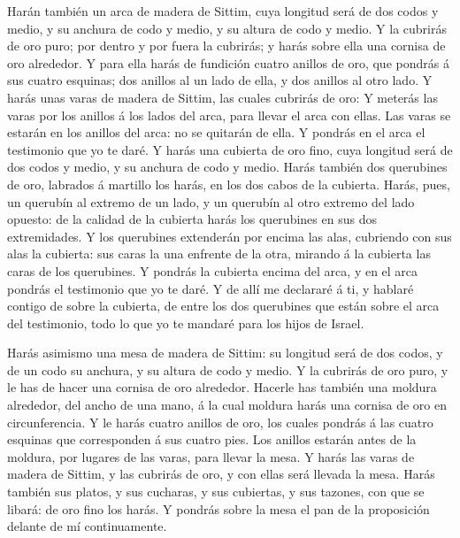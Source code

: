  Harán también un arca de madera de Sittim, cuya longitud
será de dos codos y medio, y su anchura de codo y medio, y su altura de
codo y medio.  Y la cubrirás de oro puro; por dentro y por
fuera la cubrirás; y harás sobre ella una cornisa de oro alrededor.
 Y para ella harás de fundición cuatro anillos de oro, que
pondrás á sus cuatro esquinas; dos anillos al un lado de ella, y dos
anillos al otro lado.  Y harás unas varas de madera de
Sittim, las cuales cubrirás de oro:  Y meterás las varas
por los anillos á los lados del arca, para llevar el arca con ellas.
 Las varas se estarán en los anillos del arca: no se
quitarán de ella.  Y pondrás en el arca el testimonio que
yo te daré.  Y harás una cubierta de oro fino, cuya
longitud será de dos codos y medio, y su anchura de codo y medio.
 Harás también dos querubines de oro, labrados á martillo
los harás, en los dos cabos de la cubierta.  Harás, pues,
un querubín al extremo de un lado, y un querubín al otro extremo del
lado opuesto: de la calidad de la cubierta harás los querubines en sus
dos extremidades.  Y los querubines extenderán por encima
las alas, cubriendo con sus alas la cubierta: sus caras la una enfrente
de la otra, mirando á la cubierta las caras de los querubines.
 Y pondrás la cubierta encima del arca, y en el arca
pondrás el testimonio que yo te daré.  Y de allí me
declararé á ti, y hablaré contigo de sobre la cubierta, de entre los dos
querubines que están sobre el arca del testimonio, todo lo que yo te
mandaré para los hijos de Israel.

 Harás asimismo una mesa de madera de Sittim: su longitud
será de dos codos, y de un codo su anchura, y su altura de codo y medio.
 Y la cubrirás de oro puro, y le has de hacer una cornisa
de oro alrededor.  Hacerle has también una moldura
alrededor, del ancho de una mano, á la cual moldura harás una cornisa de
oro en circunferencia.  Y le harás cuatro anillos de oro,
los cuales pondrás á las cuatro esquinas que corresponden á sus cuatro
pies.  Los anillos estarán antes de la moldura, por lugares
de las varas, para llevar la mesa.  Y harás las varas de
madera de Sittim, y las cubrirás de oro, y con ellas será llevada la
mesa.  Harás también sus platos, y sus cucharas, y sus
cubiertas, y sus tazones, con que se libará: de oro fino los harás.
 Y pondrás sobre la mesa el pan de la proposición delante
de mí continuamente.

